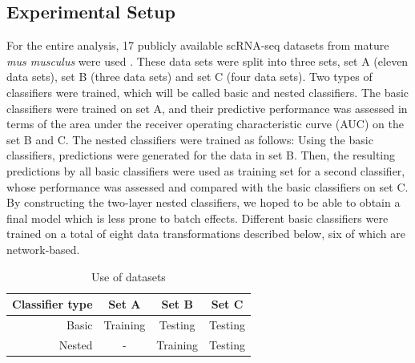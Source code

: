 \documentclass[10pt,conference,compsocconf]{IEEEtran}
\begin{document}
\subsection{Experimental Setup}
For the entire analysis, 17 publicly available scRNA-seq datasets from mature \textit{mus musculus} were used \cite{Campbell2017, Chen2017, Dahlin2018,Dulken2017, Gokce2016, Kowalczyk2015, Haber2017, Hochgerner2018, Rodda2018, Schwalie2018, Nestorowa2016, Park2018, Shah2018, TabulaMuris2017, Tasic2016, Zeisel2018}. These data sets were split into three sets, set A (eleven data sets), set B (three data sets) and set C (four data sets). Two types of classifiers were trained, which will be called basic and nested classifiers. The basic classifiers were trained on set A, and their predictive performance was assessed in terms of the area under the receiver operating characteristic curve (AUC) on the set B and C. The nested classifiers were trained as follows: Using the basic classifiers, predictions were generated for the data in set B. Then, the resulting predictions by all basic classifiers were used as training set for a second classifier, whose performance was assessed and compared with the basic classifiers on set C. By constructing the two-layer nested classifiers, we hoped to be able to obtain a final model which is less prone to batch effects. 
Different basic classifiers were trained on a total of eight data transformations described below, six of which are network-based. 
\begin{table}[H]
	\centering
	\begin{tabular}{|r|c|c|c|}
		\hline
		\textbf{Classifier type} & \textbf{Set A} & \textbf{Set B} & \textbf{Set C} \\ \hline
		Basic & Training & Testing & Testing \\
		Nested & - & Training & Testing \\
		\hline
	\end{tabular}
	\caption{Use of datasets}
\end{table}
\end{document}
